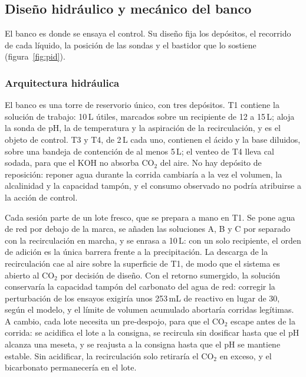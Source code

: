 \subsection{Diseño hidráulico y mecánico del banco}\label{sec:hid}

El banco es donde se ensaya el control. Su diseño fija los depósitos, el recorrido de cada líquido, la posición de las sondas y el bastidor que lo sostiene (figura~\ref{fig:pid}).

\subsubsection{Arquitectura hidráulica}\label{sec:archid}
El banco es una torre de reservorio único, con tres depósitos. T1 contiene la solución de trabajo: 10\,L útiles, marcados sobre un recipiente de 12 a 15\,L; aloja la sonda de pH, la de temperatura y la aspiración de la recirculación, y es el objeto de control. T3 y T4, de 2\,L cada uno, contienen el ácido y la base diluidos, sobre una bandeja de contención de al menos 5\,L; el venteo de T4 lleva cal sodada, para que el KOH no absorba CO$_2$ del aire. No hay depósito de reposición: reponer agua durante la corrida cambiaría a la vez el volumen, la alcalinidad y la capacidad tampón, y el consumo observado no podría atribuirse a la acción de control.

Cada sesión parte de un lote fresco, que se prepara a mano en T1. Se pone agua de red por debajo de la marca, se añaden las soluciones A, B y C por separado con la recirculación en marcha, y se enrasa a 10\,L: con un solo recipiente, el orden de adición es la única barrera frente a la precipitación. La descarga de la recirculación cae al aire sobre la superficie de T1, de modo que el sistema es abierto al CO$_2$ por decisión de diseño. Con el retorno sumergido, la solución conservaría la capacidad tampón del carbonato del agua de red: corregir la perturbación de los ensayos exigiría unos 253\,mL de reactivo en lugar de 30, según el modelo, y el límite de volumen acumulado abortaría corridas legítimas. A cambio, cada lote necesita un pre-despojo, para que el CO$_2$ escape antes de la corrida: se acidifica el lote a la consigna, se recircula sin dosificar hasta que el pH alcanza una meseta, y se reajusta a la consigna hasta que el pH se mantiene estable. Sin acidificar, la recirculación solo retiraría el CO$_2$ en exceso, y el bicarbonato permanecería en el lote.


